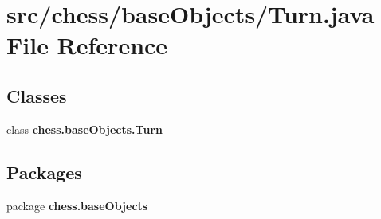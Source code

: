 \section{src/chess/base\+Objects/\+Turn.java File Reference}
\label{_turn_8java}
\subsection*{Classes}
\begin{DoxyCompactItemize}
\item 
class {\bf chess.\+base\+Objects.\+Turn}
\end{DoxyCompactItemize}
\subsection*{Packages}
\begin{DoxyCompactItemize}
\item 
package {\bf chess.\+base\+Objects}
\end{DoxyCompactItemize}
